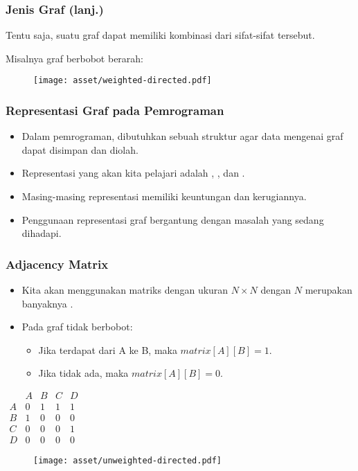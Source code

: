 \begin{frame}
\frametitle{Jenis Graf (lanj.)}
Tentu saja, suatu graf dapat memiliki kombinasi dari sifat-sifat tersebut.

Misalnya graf berbobot berarah:
\newline
\begin{figure}
  \centering
  \texttt{[image: asset/weighted-directed.pdf]}
\end{figure}
\end{frame}

\begin{frame}
\frametitle{Representasi Graf pada Pemrograman}

\begin{itemize}
  \item Dalam pemrograman, dibutuhkan sebuah struktur agar data mengenai graf dapat disimpan dan diolah.
  \item Representasi yang akan kita pelajari adalah \fadjacencymatrix, \fadjacencylist, dan \fedgelist.
  \item Masing-masing representasi memiliki keuntungan dan kerugiannya.
  \item Penggunaan representasi graf bergantung dengan masalah yang sedang dihadapi.
\end{itemize}
\end{frame}

\begin{frame}
\frametitle{Adjacency Matrix}
\begin{itemize}
  \item Kita akan menggunakan matriks dengan ukuran $N \times N$ dengan $N$ merupakan banyaknya \fnode.
  \item Pada graf tidak berbobot:
  \begin{itemize}
    \item Jika terdapat \fedge dari A ke B, maka $matrix[A][B] = 1$. 
    \item Jika tidak ada, maka $matrix[A][B] = 0$.
  \end{itemize}
\end{itemize}

\begin{center}
\begin{multicols}{2}
  $\begin{array}{c|cccc}
      & A & B & C & D \\ \hline
    A & 0 & 1 & 1 & 1 \\
    B & 1 & 0 & 0 & 0 \\
    C & 0 & 0 & 0 & 1 \\
    D & 0 & 0 & 0 & 0
  \end{array}$
  \break
  \begin{figure}
    \texttt{[image: asset/unweighted-directed.pdf]}
  \end{figure}
\end{multicols} 
\end{center}
\end{frame}

